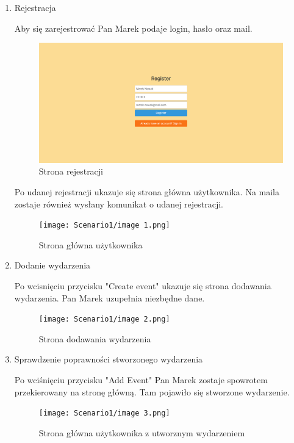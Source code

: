 \documentclass[11pt,a4paper]{article}
\begin{document}
\begin{enumerate}
    \item Rejestracja

    Aby się zarejestrować Pan Marek podaje login, hasło oraz mail. 
    
    \begin{figure} [H]
    \centering
    \includegraphics[width=0.9\linewidth]{Scenario1/image.png}
    \caption{Strona rejestracji}
    \end{figure}

    Po udanej rejestracji ukazuje się strona główna użytkownika. Na maila zostaje również wysłany komunikat o udanej rejestracji.

    \begin{figure} [H]
    \centering
    \texttt{[image: Scenario1/image 1.png]}
    \caption{Strona główna użytkownika}
    \end{figure}
    
    \item Dodanie wydarzenia

    Po wcisnięciu przycisku "Create event" ukazuje się strona dodawania wydarzenia. Pan Marek uzupełnia niezbędne dane.

    \begin{figure} [H]
    \centering
    \texttt{[image: Scenario1/image 2.png]}
    \caption{Strona dodawania wydarzenia}
    \end{figure}

    \newpage
    
    \item Sprawdzenie poprawności stworzonego wydarzenia

    Po wciśnięciu przycisku "Add Event" Pan Marek zostaje spowrotem przekierowany na stronę główną. Tam pojawiło się stworzone wydarzenie.

    \begin{figure} [H]
    \centering
    \texttt{[image: Scenario1/image 3.png]}
    \caption{Strona główna użytkownika z utworznym wydarzeniem}
    \end{figure}


\end{enumerate}
\end{document}
